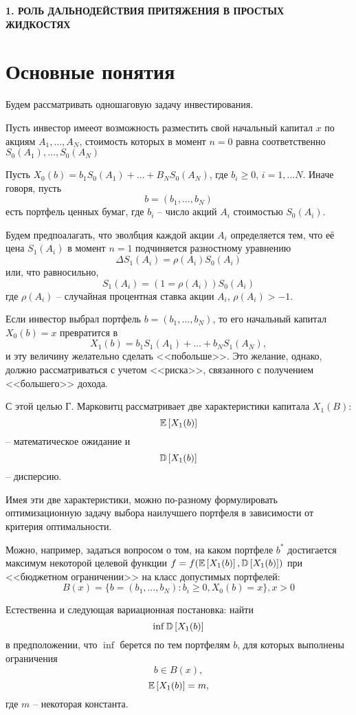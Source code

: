 \newpage
\begin{center}
	\textbf{\large 1. РОЛЬ ДАЛЬНОДЕЙСТВИЯ ПРИТЯЖЕНИЯ В ПРОСТЫХ ЖИДКОСТЯХ}
\end{center}

\section{Основные понятия}

Будем рассматривать одношаговую задачу инвестирования.

Пусть инвестор имееот возможность разместить свой начальный капитал $x$ по акциям $A_1, \dots, A_N$, стоимость которых 
в момент $n=0$ равна соответственно
$S_0(A_1), \dots, S_0(A_N)$

Пусть $X_0(b) = b_1 S_0(A_1) + \dots + B_N S_0(A_N)$, где $b_i \ge 0$, $i=1, \dots N$. Иначе говоря, пусть
\[
b = (b_1, \dots, b_N )
\]
есть портфель ценных бумаг, где $b_i$ -- число акций $A_i$ стоимостью $S_0(A_i)$.

Будем предпоалагать, что эволбция каждой акции $A_i$ определяется тем, что её цена $S_1(A_i)$ в момент $n=1$ подчиняется 
разностному уравнению
\[
\Delta S_1(A_i) = \rho(A_i) S_0(A_i)
\]
или, что равносильно,
\[
S_1(A_i) = (1 = \rho(A_i))S_0(A_i)
\]
где $\rho(A_i)$ -- случайная процентная ставка акции $A_i$, $\rho(A_i) > -1$.

Если инвестор выбрал портфель $b = (b_1, \dots, b_N )$, то его начальный капитал $X_0(b) = x$ превратится в 
\[
X_1(b) = b_1 S_1(A_1) + \dots + b_N S_1(A_N),
\]
и эту величину желательно сделать <<побольше>>. Это желание, однако, должно рассматриваться с учетом <<риска>>, 
связанного с получением <<большего>> дохода.

С этой целью Г. Марковитц рассматривает две характеристики капитала $X_1(B)$:
\[
\mathbb{E}\left[X_1(b)\right]
\] -- математическое ожидание
и
\[
\mathbb{D}\left[X_1(b)\right]
\] -- дисперсию.

Имея эти две характеристики, можно по-разному формулировать оптимизационную задачу выбора наилучшего портфеля в
зависимости от критерия оптимальности.

Можно, например, задаться вопросом о том, на каком портфеле $b^*$ достигается максимум некоторой целевой функции 
$f = f(\mathbb{E}\left[X_1(b)\right], \mathbb{D}\left[X_1(b)\right])$ при <<бюджетном ограничении>> на класс допустимых портфелей:
\[
B(x) = \{b=(b_1, \dots, b_N): b_i \ge 0, X_0(b) = x\}, x > 0
\]

Естественна и следующая вариационная постановка: найти
\[
\inf \mathbb{D}\left[X_1(b)\right]
\]
в предположении, что $\inf$ берется по тем портфелям $b$, для которых выполнены ограничения
\[
b \in B(x),
\]
\[
\mathbb{E}\left[X_1(b)\right] = m,
\]
где $m$ -- некоторая константа.

